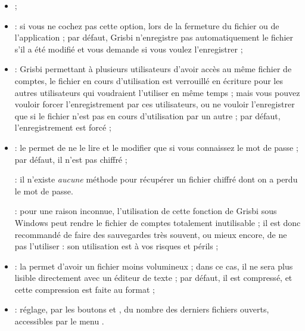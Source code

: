 \begin{itemize}
	\item {} ;
	\item {} : si vous ne cochez pas cette option, lors de la fermeture du fichier ou de l'application ; par défaut, Grisbi n'enregistre pas automatiquement le fichier s'il a été modifié et vous demande si vous voulez l'enregistrer ;
	\item {} : Grisbi permettant à plusieurs utilisateurs d'avoir accès au même fichier de comptes, le fichier en cours d'utilisation est verrouillé en écriture pour les autres utilisateurs qui voudraient l'utiliser en même temps ; mais vous pouvez vouloir forcer l'enregistrement par ces utilisateurs, ou ne vouloir l'enregistrer que si le fichier n'est pas en cours d'utilisation par un autre ; par défaut, l'enregistrement est forcé ;
	\item {} : le  permet de ne le lire et le modifier que si vous connaissez le mot de passe ; par défaut, il n'est pas chiffré ;

	 : il n'existe \emph{aucune} méthode pour récupérer un fichier chiffré dont on a perdu le mot de passe.

	 : pour une raison inconnue, l'utilisation de cette fonction de Grisbi sous Windows peut rendre le fichier de comptes totalement inutilisable ; il est donc recommandé de faire des sauvegardes très souvent, ou mieux encore, de ne pas l'utiliser : son utilisation est à vos risques et périls ;
	\item {} : la   permet d'avoir un fichier moins volumineux ; dans ce cas, il ne sera plus lisible directement avec un éditeur de texte ; par défaut, il est compressé, et cette compression est faite au format  ;
	\item {} : réglage, par les boutons \menu{+} et \menu{-}, du nombre des derniers fichiers ouverts, accessibles par le menu .
\end{itemize}

